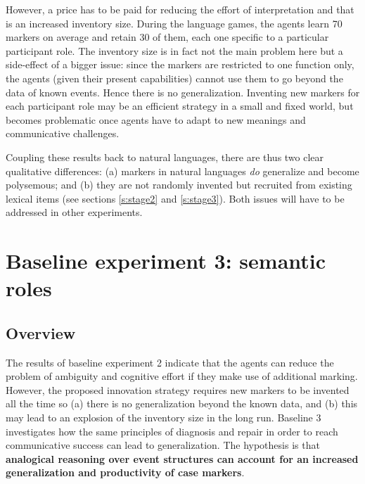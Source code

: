 \largerpage
However, a price has to be paid for reducing the effort of interpretation and that is an increased inventory size. During the language games, the agents learn 70 markers on average and retain 30 of them, each one specific to a particular participant role. The inventory size is in fact not the main problem here but a side-effect of a bigger issue: since the markers are restricted to one function only, the agents (given their present capabilities) cannot use them to go beyond the data of known events. Hence there is no generalization. Inventing new markers for each participant role may be an efficient strategy in a small and fixed world, but becomes problematic once agents have to adapt to new meanings and communicative challenges.

Coupling these results back to natural languages, there are thus two clear qualitative differences: (a) markers in natural languages {\em do} generalize and become polysemous; and (b) they are not randomly invented but recruited from existing lexical items (see sections \ref{s:stage2} and \ref{s:stage3}). Both issues will have to be addressed in other experiments.


\section{Baseline experiment 3: semantic roles}
\label{s:base3}

\subsection{Overview}
The results of baseline experiment 2 indicate that the agents can reduce the problem of ambiguity and cognitive effort if they make use of additional marking. However, the proposed innovation strategy requires new markers to be invented all the time so (a) there is no generalization beyond the known data, and (b) this may lead to an explosion of the inventory size in the long run. Baseline 3 investigates how the same principles of diagnosis and repair in order to reach communicative success can lead to generalization. The hypothesis is that {\bfseries analogical reasoning over event structures can account for an increased generalization and productivity of case markers}.

